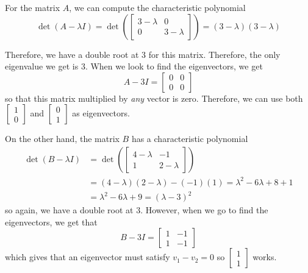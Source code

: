 \documentclass{ximera}
\begin{document}
\begin{exampleSol}
    For the matrix $A$, we can compute the characteristic polynomial
    \[ 
        \det(A - \lambda I) = \det 
        \left( 
            \begin{bmatrix} 
                3-\lambda &0 \\ 
                0 & 3 - \lambda 
            \end{bmatrix}
        \right) = (3 - \lambda)(3 - \lambda) 
    \]
    
    Therefore, we have a double root at $3$ for this matrix. Therefore, the only eigenvalue we get is $3$. When we look to find the eigenvectors, we get 
    \[ 
        A - 3 I = 
        \begin{bmatrix} 
            0 & 0 \\ 
            0 & 0 
        \end{bmatrix} 
    \] 
    so that this matrix multiplied by \emph{any} vector is zero. Therefore, we can use both $\begin{bmatrix} 1 \\ 0 \end{bmatrix}$ and $\begin{bmatrix} 0 \\ 1 \end{bmatrix}$ as eigenvectors. 
    
    On the other hand, the matrix $B$ has a characteristic polynomial 
    \[ \begin{split}
        \det(B - \lambda I) &= \det
        \left( 
            \begin{bmatrix} 
                4 - \lambda & -1 \\ 
                1 & 2 - \lambda 
            \end{bmatrix} 
        \right) \\
        &= (4-\lambda)(2-\lambda) - (-1)(1) = \lambda^2 - 6\lambda + 8 + 1 \\
        &= \lambda^2 - 6\lambda + 9 = (\lambda - 3)^2 
    \end{split}
    \]
    so again, we have a double root at $3$. However, when we go to find the eigenvectors, we get that
    \[ 
        B - 3 I = 
        \begin{bmatrix} 
            1 & -1 \\ 
            1 & -1 
        \end{bmatrix} 
    \] 
    which gives that an eigenvector must satisfy $v_1 - v_2 = 0$ so $\begin{bmatrix} 1 \\ 1 \end{bmatrix}$ works. 
\end{exampleSol}
\end{document}
